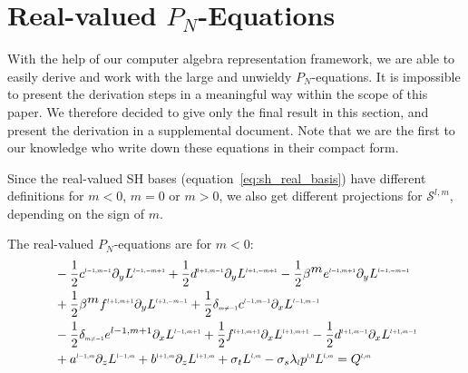\section{Real-valued $P_N$-Equations}
\label{sec:real_valued_pn_eq}

With the help of our computer algebra representation framework, we are able to easily derive and work with the large and unwieldy $P_N$-equations. It is impossible to present the derivation steps in a meaningful way within the scope of this paper. We therefore decided to give only the final result in this section, and present the derivation in a supplemental document. Note that we are the first to our knowledge who write down these equations in their compact form. 

Since the real-valued SH bases (equation~\ref{eq:sh_real_basis}) have different definitions for $m<0$, $m=0$ or $m>0$,  we also get different projections for $\mathcal{S}^{l,m}$, depending on the sign of $m$.

The real-valued $P_N$-equations are for $m<0$:
\begin{align}
&-\frac{1}{2}c^{\scaleto{l-1,m-1}{4pt}}
\partial_y
L^{\scaleto{l-1,-m+1}{4pt}}
+\frac{1}{2}d^{\scaleto{l+1,m-1}{4pt}}
\partial_y
L^{\scaleto{l+1,-m+1}{4pt}}
-\frac{1}{2}\beta^{\scaleto{m}{4pt}}e^{\scaleto{l-1,m+1}{4pt}}
\partial_y
L^{\scaleto{l-1,-m-1}{4pt}}
\nonumber
\\&
+\frac{1}{2}\beta^{\scaleto{m}{4pt}}f^{\scaleto{l+1,m+1}{4pt}}
\partial_y
L^{\scaleto{l+1,-m-1}{4pt}}
+\frac{1}{2}\delta_{\scaleto{m\neq -1}{4pt}}c^{\scaleto{l-1,m-1}{4pt}}
\partial_x
L^{\scaleto{l-1,m-1}{4pt}}
\nonumber
\\&
-\frac{1}{2}\delta_{\scaleto{m\neq -1}{4pt}}e^{{l-1,m+1}}
\partial_x
L^{\scaleto{l-1,m+1}{4pt}}
+\frac{1}{2}f^{\scaleto{l+1,m+1}{4pt}}
\partial_x
L^{\scaleto{l+1,m+1}{4pt}}
-\frac{1}{2}d^{\scaleto{l+1,m-1}{4pt}}
\partial_x
L^{\scaleto{l+1,m-1}{4pt}}
\nonumber
\\&
+a^{\scaleto{l-1,m}{4pt}}
\partial_z
L^{\scaleto{l-1,m}{4pt}}
+b^{\scaleto{l+1,m}{4pt}}
\partial_z
L^{\scaleto{l+1,m}{4pt}}
+\sigma_t L^{\scaleto{l,m}{4pt}}
-\sigma_s\lambda_{\scaleto{l}{4pt}}p^{\scaleto{l,0}{4pt}}L^{\scaleto{l,m}{4pt}}
= Q^{\scaleto{l,m}{4pt}}
\label{eq:rpn_m_<_z}
\end{align}

